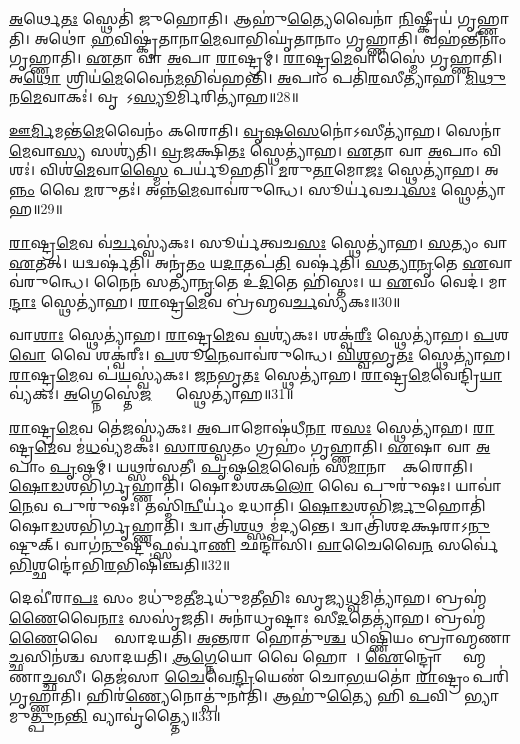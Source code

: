 \ul{𑌅}𑌰𑍍𑌥𑍇\ul{𑌤𑌃} 𑌸𑍍𑌥𑍇𑌤𑌿॑ 𑌜𑍁𑌹𑍋𑌤𑌿।
𑌆𑌹𑍁॑\ul{𑌤𑍍𑌯𑍈}𑌵𑍈𑌨𑌾॑ \ul{𑌨𑌿}𑌷𑍍𑌕𑍍𑌰𑍀𑌯॑ 𑌗𑍃𑌹𑍍𑌣𑌾𑌤𑌿।
𑌅𑌥𑍋॑ \ul{𑌹}𑌵𑌿𑌷𑍍𑌕𑍃॑𑌤𑌾𑌨𑌾\ul{𑌮𑍇}𑌵𑌾𑌭𑌿𑌘𑍃॑𑌤𑌾𑌨𑌾𑌂 𑌗𑍃𑌹𑍍𑌣𑌾𑌤𑌿।
𑌵𑌹॑𑌨𑍍𑌤𑍀𑌨𑌾𑌂 𑌗𑍃𑌹𑍍𑌣𑌾𑌤𑌿।
\ul{𑌏}𑌤𑌾 𑌵𑌾 \ul{𑌅}𑌪𑌾 \ul{𑌰𑌾}𑌷𑍍𑌟𑍍𑌰𑌮𑍍।
\ul{𑌰𑌾}𑌷𑍍𑌟𑍍𑌰\ul{𑌮𑍇}𑌵𑌾𑌸𑍍𑌮𑍈॑ 𑌗𑍃𑌹𑍍𑌣𑌾𑌤𑌿।
𑌅\ul{𑌥𑍋} 𑌶𑍍𑌰𑌿𑌯॑\ul{𑌮𑍇}𑌵𑍈𑌨॑\ul{𑌮}𑌭𑌿𑌵॑𑌹𑌨𑍍𑌤𑌿।
\ul{𑌅}𑌪𑌾𑌂 𑌪𑌤𑌿॑\ul{𑌰}𑌸𑍀𑌤𑍍𑌯𑌾॑𑌹।
\ul{𑌮𑌿}\ul{𑌥𑍁}𑌨\ul{𑌮𑍇}𑌵𑌾𑌕𑌃॑।
𑌵𑍃𑌷𑌾᳚\-𑌽\ul{𑌸𑍍𑌯𑍂}𑌰𑍍𑌮𑌿𑌰𑌿𑌤𑍍𑌯𑌾॑𑌹॥28॥

\ul{𑌊}\ul{𑌰𑍍𑌮𑌿}𑌮𑌨𑍍𑌤॑\ul{𑌮𑍇}𑌵𑍈𑌨𑌂॑ 𑌕𑌰𑍋𑌤𑌿।
\ul{𑌵𑍃}\ul{𑌷}\ul{𑌸𑍇}𑌨𑍋॑\-𑌽𑌸𑍀𑌤𑍍𑌯𑌾॑𑌹।
𑌸𑍇𑌨𑌾॑\ul{𑌮𑍇}𑌵𑌾\ul{𑌸𑍍𑌯} 𑌸𑌶𑍍𑌯॑𑌤𑌿।
\ul{𑌵𑍍𑌰}\ul{𑌜}𑌕𑍍𑌷𑌿\ul{𑌤𑌃} 𑌸𑍍𑌥𑍇𑌤𑍍𑌯𑌾॑𑌹।
\ul{𑌏}𑌤𑌾 𑌵𑌾 \ul{𑌅}𑌪𑌾𑌂 𑌵𑌿𑌶𑌃॑।
𑌵𑌿𑌶॑\ul{𑌮𑍇}𑌵𑌾\ul{𑌸𑍍𑌮𑍈} 𑌪𑌰𑍍𑌯𑍂॑𑌹𑌤𑌿।
\ul{𑌮}𑌰𑍁\ul{𑌤𑌾}𑌮𑍋\ul{𑌜𑌃} 𑌸𑍍𑌥𑍇𑌤𑍍𑌯𑌾॑𑌹।
𑌅\ul{𑌨𑍍𑌨𑌂} 𑌵𑍈 \ul{𑌮}𑌰𑍁𑌤𑌃॑।
𑌅𑌨𑍍𑌨॑\ul{𑌮𑍇}𑌵𑌾𑌵॑𑌰𑍁𑌨𑍍𑌧𑍇।
𑌸𑍂𑌰𑍍𑌯॑𑌵𑌰𑍍𑌚\ul{𑌸𑌃} 𑌸𑍍𑌥𑍇𑌤𑍍𑌯𑌾॑𑌹॥29॥

\ul{𑌰𑌾}𑌷𑍍𑌟𑍍𑌰\ul{𑌮𑍇}𑌵 𑌵॑\ul{𑌰𑍍𑌚}𑌸𑍍𑌵𑍍𑌯॑𑌕𑌃।
𑌸𑍂𑌰𑍍𑌯॑𑌤𑍍𑌵𑌚\ul{𑌸𑌃} 𑌸𑍍𑌥𑍇𑌤𑍍𑌯𑌾॑𑌹।
\ul{𑌸}𑌤𑍍𑌯𑌂 𑌵𑌾 \ul{𑌏}𑌤𑌤𑍍।
𑌯𑌦𑍍𑌵𑌰𑍍\mbox{}𑌷॑𑌤𑌿।
𑌅𑌨𑍃॑\ul{𑌤𑌂} 𑌯\ul{𑌦𑌾}𑌤𑌪॑\ul{𑌤𑌿} 𑌵𑌰𑍍\mbox{}𑌷॑𑌤𑌿।
\ul{𑌸}\ul{𑌤𑍍𑌯𑌾}\ul{𑌨𑍃}𑌤𑍇 \ul{𑌏}𑌵𑌾𑌵॑𑌰𑍁𑌨𑍍𑌧𑍇।
𑌨𑍈𑌨॑ 𑌸𑌤𑍍𑌯𑌾\ul{𑌨𑍃}𑌤𑍇 𑌉॑\ul{𑌦𑌿}𑌤𑍇 𑌹𑌿॑𑌸𑍍𑌤𑌃।
𑌯 \ul{𑌏}𑌵𑌂 𑌵𑍇𑌦॑।
𑌮𑌾\ul{𑌨𑍍𑌦𑌾𑌃} 𑌸𑍍𑌥𑍇𑌤𑍍𑌯𑌾॑𑌹।
\ul{𑌰𑌾}𑌷𑍍𑌟𑍍𑌰\ul{𑌮𑍇}𑌵 𑌬𑍍𑌰॑𑌹𑍍𑌮𑌵\ul{𑌰𑍍𑌚}𑌸𑍍𑌯॑𑌕𑌃॥30॥

𑌵𑌾\ul{𑌶𑌾𑌃} 𑌸𑍍𑌥𑍇𑌤𑍍𑌯𑌾॑𑌹।
\ul{𑌰𑌾}𑌷𑍍𑌟𑍍𑌰\ul{𑌮𑍇}𑌵 \ul{𑌵}𑌶𑍍𑌯॑𑌕𑌃।
𑌶𑌕𑍍𑌵॑\ul{𑌰𑍀𑌃} 𑌸𑍍𑌥𑍇𑌤𑍍𑌯𑌾॑𑌹।
\ul{𑌪}𑌶\ul{𑌵𑍋} 𑌵𑍈 𑌶𑌕𑍍𑌵॑𑌰𑍀𑌃।
\ul{𑌪}𑌶𑍂\ul{𑌨𑍇}𑌵𑌾𑌵॑𑌰𑍁𑌨𑍍𑌧𑍇।
\ul{𑌵𑌿}\ul{𑌶𑍍𑌵}𑌭𑍃\ul{𑌤𑌃} 𑌸𑍍𑌥𑍇𑌤𑍍𑌯𑌾॑𑌹।
\ul{𑌰𑌾}𑌷𑍍𑌟𑍍𑌰\ul{𑌮𑍇}𑌵 𑌪॑\ul{𑌯}𑌸𑍍𑌵𑍍𑌯॑𑌕𑌃।
\ul{𑌜}\ul{𑌨}𑌭𑍃\ul{𑌤𑌃} 𑌸𑍍𑌥𑍇𑌤𑍍𑌯𑌾॑𑌹।
\ul{𑌰𑌾}𑌷𑍍𑌟𑍍𑌰\ul{𑌮𑍇}𑌵𑍇𑌨𑍍𑌦𑍍𑌰𑌿॑\ul{𑌯𑌾}𑌵𑍍𑌯॑𑌕𑌃।
\ul{𑌅}𑌗𑍍𑌨𑍇𑌸𑍍𑌤𑍇॑\ul{𑌜}𑌸𑍍𑌯𑌾𑌃᳚ 𑌸𑍍𑌥𑍇𑌤𑍍𑌯𑌾॑𑌹॥31॥

\ul{𑌰𑌾}𑌷𑍍𑌟𑍍𑌰\ul{𑌮𑍇}𑌵 𑌤𑍇॑\ul{𑌜}𑌸𑍍𑌵𑍍𑌯॑𑌕𑌃।
\ul{𑌅}𑌪𑌾𑌮𑍋𑌷॑𑌧𑍀\ul{𑌨𑌾}\ul{} 𑌰\ul{𑌸𑌃} 𑌸𑍍𑌥𑍇𑌤𑍍𑌯𑌾॑𑌹।
\ul{𑌰𑌾}𑌷𑍍𑌟𑍍𑌰\ul{𑌮𑍇}𑌵 𑌮॑\ul{𑌧}𑌵𑍍𑌯॑𑌮𑌕𑌃।
\ul{𑌸𑌾}\ul{𑌰}\ul{𑌸𑍍𑌵}𑌤𑌂 𑌗𑍍𑌰𑌹𑌂॑ 𑌗𑍃𑌹𑍍𑌣𑌾𑌤𑌿।
\ul{𑌏}𑌷𑌾 𑌵𑌾 \ul{𑌅}𑌪𑌾𑌂 \ul{𑌪𑍃}𑌷𑍍𑌠𑌮𑍍।
𑌯𑌥𑍍𑌸𑌰॑𑌸𑍍𑌵𑌤𑍀।
\ul{𑌪𑍃}𑌷𑍍𑌠\ul{𑌮𑍇}𑌵𑍈𑌨॑ 𑌸\ul{𑌮𑌾}𑌨𑌾𑌨𑌾𑌂᳚ 𑌕𑌰𑍋𑌤𑌿।
\ul{𑌷𑍋}\ul{𑌡}𑌶𑌭𑌿॑𑌰𑍍𑌗𑍃𑌹𑍍𑌣𑌾𑌤𑌿।
𑌷𑍋𑌡॑𑌶𑌕\ul{𑌲𑍋} 𑌵𑍈 𑌪𑍁𑌰𑍁॑𑌷𑌃।
𑌯𑌾𑌵𑌾॑\ul{𑌨𑍇}𑌵 𑌪𑍁𑌰𑍁॑𑌷𑌃।
𑌤𑌸𑍍𑌮𑌿॑\ul{𑌨𑍍𑌵𑍀}𑌰𑍍𑌯𑌂॑ 𑌦𑌧𑌾𑌤𑌿।
\ul{𑌷𑍋}\ul{𑌡}𑌶𑌭𑌿॑\ul{𑌰𑍍𑌜𑍁}𑌹𑍋𑌤𑌿॑ 𑌷𑍋\ul{𑌡}𑌶𑌭𑌿॑𑌰𑍍𑌗𑍃𑌹𑍍𑌣𑌾𑌤𑌿।
𑌦𑍍𑌵𑌾𑌤𑍍𑌰𑌿॑\ul{𑌶}𑌥𑍍𑌸𑌮𑍍𑌪॑𑌦𑍍𑌯𑌨𑍍𑌤𑍇।
𑌦𑍍𑌵𑌾𑌤𑍍𑌰𑌿॑𑌶𑌦𑌕𑍍𑌷𑌰𑌾\-𑌽\ul{𑌨𑍁}𑌷𑍍𑌟𑍁𑌕𑍍।
𑌵𑌾𑌗॑\ul{𑌨𑍁}𑌷𑍍𑌟𑍁𑌫𑍍𑌸𑌰𑍍𑌵𑌾॑\ul{𑌣𑌿} 𑌛𑌨𑍍𑌦𑌾॑𑌸𑌿।
\ul{𑌵𑌾}𑌚𑍈𑌵𑍈\ul{𑌨}\ul{} 𑌸𑌰𑍍𑌵𑍇॑\ul{𑌭𑌿}𑌶𑍍𑌛𑌨𑍍𑌦𑍋॑𑌭𑌿\ul{𑌰}𑌭𑌿𑌷𑌿॑𑌞𑍍𑌚𑌤𑌿॥32॥\anuvakamend[\ul{𑌊}𑌰𑍍𑌮𑌿𑌰𑌿𑌤𑍍𑌯𑌾॑\ul{𑌹} 𑌸𑍂𑌰𑍍𑌯॑𑌵𑌰𑍍𑌚\ul{𑌸𑌃} 𑌸𑍍𑌥𑍇𑌤𑍍𑌯𑌾॑𑌹 𑌬𑍍𑌰𑌹𑍍𑌮𑌵\ul{𑌰𑍍𑌚}𑌸𑍍𑌯॑𑌕𑌸𑍍𑌤𑍇\ul{𑌜}𑌸𑍍𑌯𑌾𑌃᳚ 𑌸𑍍𑌥𑍇𑌤𑍍𑌯𑌾॑\ul{𑌹𑍈}𑌵 𑌪𑍁𑌰𑍁॑\ul{𑌷𑌃} 𑌷𑌟𑍍 𑌚॑]

𑌦𑍇𑌵𑍀॑𑌰𑌾\ul{𑌪𑌃} 𑌸𑌂 𑌮𑌧𑍁॑𑌮\ul{𑌤𑍀}𑌰𑍍𑌮𑌧𑍁॑𑌮𑌤𑍀𑌭𑌿𑌃 𑌸𑍃𑌜𑍍𑌯\ul{𑌧𑍍𑌵}𑌮𑌿𑌤𑍍𑌯𑌾॑𑌹।
𑌬𑍍𑌰𑌹𑍍𑌮॑\ul{𑌣𑍈}𑌵𑍈\ul{𑌨𑌾𑌃} 𑌸𑌸𑍃॑𑌜𑌤𑌿।
𑌅𑌨𑌾॑𑌧𑍃𑌷𑍍𑌟𑌾𑌃 𑌸𑍀\ul{𑌦}𑌤𑍇𑌤𑍍𑌯𑌾॑𑌹।
𑌬𑍍𑌰𑌹𑍍𑌮॑\ul{𑌣𑍈}𑌵𑍈𑌨𑌾𑌃᳚ 𑌸𑌾𑌦𑌯𑌤𑌿।
\ul{𑌅}\ul{𑌨𑍍𑌤}𑌰𑌾 𑌹𑍋𑌤𑍁॑\ul{𑌶𑍍𑌚} 𑌧𑌿𑌷𑍍𑌣𑌿॑𑌯𑌂 𑌬𑍍𑌰𑌾𑌹𑍍𑌮𑌣𑌾\ul{𑌚𑍍𑌛}\ul{}𑌸𑌿𑌨॑𑌶𑍍𑌚 𑌸𑌾𑌦𑌯𑌤𑌿।
\ul{𑌆}\ul{𑌗𑍍𑌨𑍇}𑌯𑍋 𑌵𑍈 𑌹𑍋𑌤𑌾᳚।
\ul{𑌐}𑌨𑍍𑌦𑍍𑌰𑍋 𑌬𑍍𑌰𑌾᳚𑌹𑍍𑌮𑌣𑌾\ul{𑌚𑍍𑌛}\ul{}𑌸𑍀।
𑌤𑍇𑌜॑𑌸𑌾 \ul{𑌚𑍈}𑌵𑍇\ul{𑌨𑍍𑌦𑍍𑌰𑌿}𑌯𑍇𑌣॑ 𑌚𑍋\ul{𑌭}𑌯𑌤𑍋॑ \ul{𑌰𑌾}𑌷𑍍𑌟𑍍𑌰𑌂 𑌪𑌰𑌿॑𑌗𑍃𑌹𑍍𑌣𑌾𑌤𑌿।
𑌹𑌿𑌰॑\ul{𑌣𑍍𑌯𑍇}𑌨𑍋𑌤𑍍𑌪𑍁॑𑌨𑌾𑌤𑌿।
𑌆𑌹𑍁॑\ul{𑌤𑍍𑌯𑍈} 𑌹𑌿 \ul{𑌪}𑌵𑌿𑌤𑍍𑌰𑌾᳚𑌭𑍍𑌯𑌾𑌮𑍁\ul{𑌤𑍍𑌪𑍁}𑌨\ul{𑌨𑍍𑌤𑌿} 𑌵𑍍𑌯𑌾𑌵𑍃॑𑌤𑍍𑌤𑍍𑌯𑍈॥33॥

